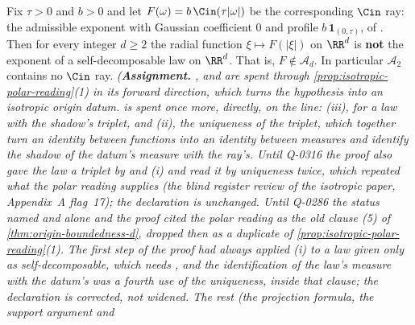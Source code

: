 \begin{theorem}
\label{thm:no-cin-ray-in-the-plane}
\leanok
Fix $\tau > 0$ and $b > 0$ and let $F(\omega) = b\,\Cin(\tau|\omega|)$ be the corresponding $\Cin$
ray: the admissible exponent with Gaussian coefficient $0$ and profile
$b\,\mathbf{1}_{(0,\tau)}$, of . Then for every integer $d \ge 2$ the radial function
$\xi \mapsto F(|\xi|)$ on $\RR^d$ is \textbf{not} the exponent of a self-decomposable law on
$\RR^d$. That is, $F \notin \mathcal{A}_d$. In particular $\mathcal{A}_2$ contains no $\Cin$ ray.
\statusA\quad{}\quad{}\quad{}\quad\emph{(\textbf{Assignment.}
,  and  are spent through \ref{prop:isotropic-polar-reading}(1) in
its forward direction, which turns the hypothesis into an isotropic origin datum.  is
spent once more, directly, on the line: (iii), for a law with the shadow's triplet, and (ii), the
uniqueness of the triplet, which together turn an identity between \emph{functions} into an
identity between \emph{measures} and identify the shadow of the datum's \Levy{} measure with the
ray's. Until Q-0316 the proof also gave the law a triplet by
 and (i) and read it by uniqueness twice, which repeated what the polar reading
supplies (the blind register review of the isotropic paper, Appendix~A flag~17); the declaration is
unchanged. Until Q-0286 the status named
 and  alone and the proof cited the polar reading as the
old clause (5) of \ref{thm:origin-boundedness-d}, dropped then as a duplicate of
\ref{prop:isotropic-polar-reading}(1). The first step of the proof had always applied (i)
to a law given only as self-decomposable, which needs , and the identification of the
law's \Levy{} measure with the datum's was a fourth use of the uniqueness, inside that clause; the
declaration is corrected, not widened. The rest (the projection formula, the support argument and
}
\end{theorem}
